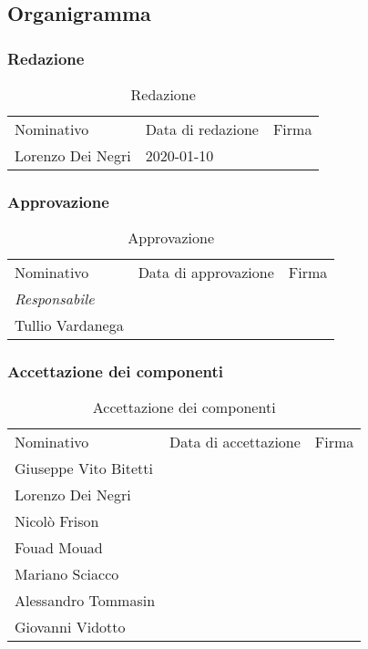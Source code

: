 	\subsection{Organigramma}
		
		\subsubsection{Redazione}
			
			\begin{table}[h!]
				\centering
					\begin{tabular}{lll}
						Nominativo & Data di redazione & Firma \\
						Lorenzo Dei Negri & 2020-01-10 & \\
					\end{tabular}
				\caption{Redazione}
			\end{table}
		
		\subsubsection{Approvazione}
			
			\begin{table}[h!]
				\centering
				\begin{tabular}{lll}
					Nominativo & Data di approvazione & Firma \\
					\textit{Responsabile} & & \\
					Tullio Vardanega & & \\
				\end{tabular}
				\caption{Approvazione}
			\end{table}
			
		\subsubsection{Accettazione dei componenti}
			
			\begin{table}[h!]
				\centering
				\begin{tabular}{lll}
					Nominativo & Data di accettazione & Firma \\
					Giuseppe Vito Bitetti & & \\
					Lorenzo Dei Negri & & \\
					Nicolò Frison & & \\
					Fouad Mouad & & \\
					Mariano Sciacco & & \\
					Alessandro Tommasin & & \\
					Giovanni Vidotto & & \\
				\end{tabular}
				\caption{Accettazione dei componenti}
			\end{table}
			
